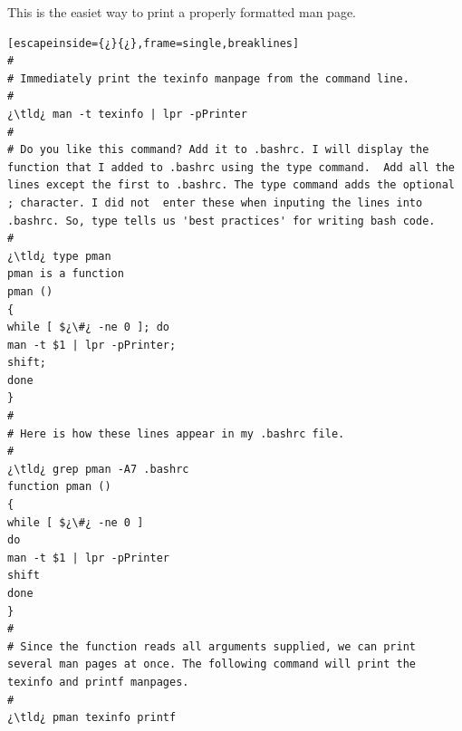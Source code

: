 This is the easiet way to print a properly formatted man page.

\begin{lstlisting}[escapeinside={¿}{¿},frame=single,breaklines]
#
# Immediately print the texinfo manpage from the command line.
#
¿\tld¿ man -t texinfo | lpr -pPrinter
#
# Do you like this command? Add it to .bashrc. I will display the function that I added to .bashrc using the type command.  Add all the lines except the first to .bashrc. The type command adds the optional ; character. I did not  enter these when inputing the lines into .bashrc. So, type tells us 'best practices' for writing bash code.
#
¿\tld¿ type pman
pman is a function
pman () 
{ 
while [ $¿\#¿ -ne 0 ]; do
man -t $1 | lpr -pPrinter;
shift;
done
}
#
# Here is how these lines appear in my .bashrc file.
#
¿\tld¿ grep pman -A7 .bashrc
function pman ()
{
while [ $¿\#¿ -ne 0 ]
do
man -t $1 | lpr -pPrinter
shift
done
}
#
# Since the function reads all arguments supplied, we can print several man pages at once. The following command will print the texinfo and printf manpages.
#
¿\tld¿ pman texinfo printf
\end{lstlisting}

